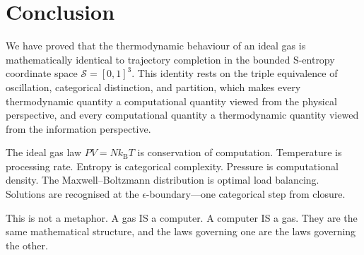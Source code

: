 \documentclass[twocolumn,10pt,a4paper]{article}
\theoremstyle{plain}
\theoremstyle{definition}
\theoremstyle{remark}
\newcommand{\kB}{k_{\mathrm{B}}}
\newcommand{\Sspace}{\mathcal{S}}
\begin{document}
\section{Conclusion}
\label{sec:conclusion}

We have proved that the thermodynamic behaviour of an ideal gas is mathematically identical to trajectory completion in the bounded S-entropy coordinate space $\Sspace = [0,1]^3$. This identity rests on the triple equivalence of oscillation, categorical distinction, and partition, which makes every thermodynamic quantity a computational quantity viewed from the physical perspective, and every computational quantity a thermodynamic quantity viewed from the information perspective.

The ideal gas law $PV = N\kB T$ is conservation of computation. Temperature is processing rate. Entropy is categorical complexity. Pressure is computational density. The Maxwell--Boltzmann distribution is optimal load balancing. Solutions are recognised at the $\epsilon$-boundary---one categorical step from closure.

This is not a metaphor. A gas IS a computer. A computer IS a gas. They are the same mathematical structure, and the laws governing one are the laws governing the other.



\end{document}
